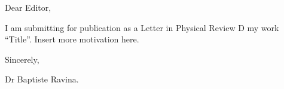 \documentclass[superscriptaddress,preprintnumbers,amssymb,nofootinbib]{revtex4-2}
\begin{document}
Dear Editor,

I am submitting for publication as a Letter in Physical Review D my work ``Title''.
Insert more motivation here.

Sincerely,

Dr Baptiste Ravina.
\end{document}
